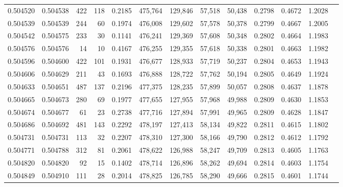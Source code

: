 \begin{tabular}{rrrrrrrrrrrrr}
0.504520 & 0.504538 &   422 &   118 &                                     0.2185 & 475,764 & 129,846 &  57,518 &  50,438 & 0.2798 & 0.4672 & 1.2028 \\
0.504539 & 0.504539 &   244 &    60 &                                     0.1974 & 476,008 & 129,602 &  57,578 &  50,378 & 0.2799 & 0.4667 & 1.2005 \\
0.504542 & 0.504575 &   233 &    30 &                                     0.1141 & 476,241 & 129,369 &  57,608 &  50,348 & 0.2802 & 0.4664 & 1.1983 \\
0.504576 & 0.504576 &    14 &    10 &                                     0.4167 & 476,255 & 129,355 &  57,618 &  50,338 & 0.2801 & 0.4663 & 1.1982 \\
0.504596 & 0.504600 &   422 &   101 &                                     0.1931 & 476,677 & 128,933 &  57,719 &  50,237 & 0.2804 & 0.4653 & 1.1943 \\
0.504606 & 0.504629 &   211 &    43 &                                     0.1693 & 476,888 & 128,722 &  57,762 &  50,194 & 0.2805 & 0.4649 & 1.1924 \\
0.504633 & 0.504651 &   487 &   137 &                                     0.2196 & 477,375 & 128,235 &  57,899 &  50,057 & 0.2808 & 0.4637 & 1.1878 \\
0.504665 & 0.504673 &   280 &    69 &                                     0.1977 & 477,655 & 127,955 &  57,968 &  49,988 & 0.2809 & 0.4630 & 1.1853 \\
0.504674 & 0.504677 &    61 &    23 &                                     0.2738 & 477,716 & 127,894 &  57,991 &  49,965 & 0.2809 & 0.4628 & 1.1847 \\
0.504686 & 0.504692 &   481 &   143 &                                     0.2292 & 478,197 & 127,413 &  58,134 &  49,822 & 0.2811 & 0.4615 & 1.1802 \\
0.504731 & 0.504731 &   113 &    32 &                                     0.2207 & 478,310 & 127,300 &  58,166 &  49,790 & 0.2812 & 0.4612 & 1.1792 \\
0.504771 & 0.504788 &   312 &    81 &                                     0.2061 & 478,622 & 126,988 &  58,247 &  49,709 & 0.2813 & 0.4605 & 1.1763 \\
0.504820 & 0.504820 &    92 &    15 &                                     0.1402 & 478,714 & 126,896 &  58,262 &  49,694 & 0.2814 & 0.4603 & 1.1754 \\
0.504849 & 0.504910 &   111 &    28 &                                     0.2014 & 478,825 & 126,785 &  58,290 &  49,666 & 0.2815 & 0.4601 & 1.1744 \\

\end{tabular}
